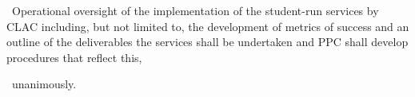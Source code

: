 \begin{motion}
    \birt\ Operational oversight of the implementation of the student-run
    services by CLAC including, but not limited to, the development of metrics
    of success and an outline of the deliverables the services shall be
    undertaken and PPC shall develop procedures that reflect this,

    \movers{\seneca}{\katie}
    \carries\ unanimously.
\end{motion}
